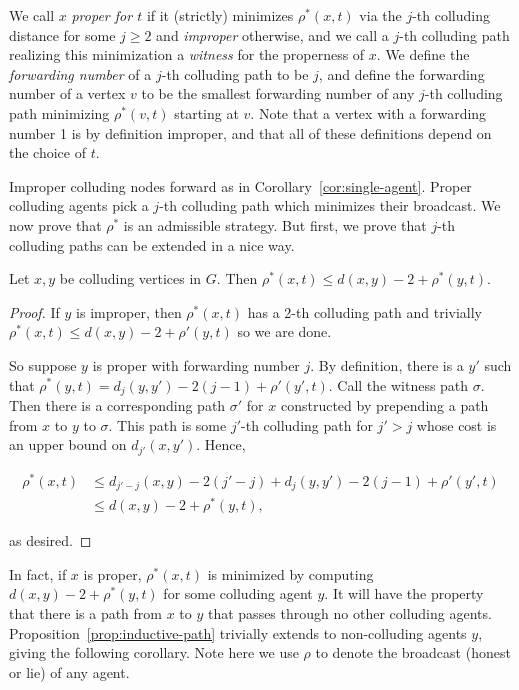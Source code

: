 \documentclass{comnet}
\begin{document}
We call $x$ \emph{proper for $t$} if it (strictly) minimizes $\rho^*(x,t)$ via
the $j$-th colluding distance for some $j \geq 2$ and \emph{improper}
otherwise, and we call a $j$-th colluding path realizing this minimization a
\emph{witness} for the properness of $x$. We define the \emph{forwarding
number} of a $j$-th colluding path to be $j$, and define the forwarding number
of a vertex $v$ to be the smallest forwarding number of any $j$-th colluding
path minimizing $\rho^*(v,t)$ starting at $v$. Note that a vertex with a
forwarding number 1 is by definition improper, and that all of these
definitions depend on the choice of $t$.

Improper colluding nodes forward as in Corollary~\ref{cor:single-agent}. Proper
colluding agents pick a $j$-th colluding path which minimizes their broadcast.
We now prove that $\rho^*$ is an admissible strategy. But first, we prove that
$j$-th colluding paths can be extended in a nice way.

\begin{proposition} \label{prop:inductive-path}

Let $x,y$ be colluding vertices in $G$. Then $\rho^*(x,t) \leq d(x,y) - 2 +
\rho^*(y,t)$.

\end{proposition}

\begin{proof}

If $y$ is improper, then $\rho^*(x,t)$ has a 2-th colluding path and trivially
$\rho^*(x,t) \leq d(x,y) - 2 + \rho'(y,t)$ so we are done.

So suppose $y$ is proper with forwarding number $j$. By definition, there is a
$y'$ such that $\rho^*(y,t) = d_j(y,y') - 2(j-1) + \rho'(y',t)$. Call the
witness path $\sigma$. Then there is a corresponding path $\sigma'$ for $x$
constructed by prepending a path from $x$ to $y$ to $\sigma$. This path is some
$j'$-th colluding path for $j' > j$ whose cost is an upper bound on
$d_{j'}(x,y')$.  Hence,

\begin{align*}
   \rho^*(x,t) &\leq d_{j'-j}(x,y) - 2(j' - j) + d_j(y,y') - 2(j-1) +
\rho'(y',t) \\
               &\leq d(x,y) - 2 + \rho^*(y,t),
\end{align*}

as desired.
\end{proof}

In fact, if $x$ is proper, $\rho^*(x,t)$ is minimized by computing $d(x,y) - 2
+ \rho^*(y,t)$ for some colluding agent $y$. It will have the property that
there is a path from $x$ to $y$ that passes through no other colluding agents.
Proposition~\ref{prop:inductive-path} trivially extends to non-colluding agents
$y$, giving the following corollary. Note here we use $\rho$ to denote the
broadcast (honest or lie) of any agent.
\end{document}
